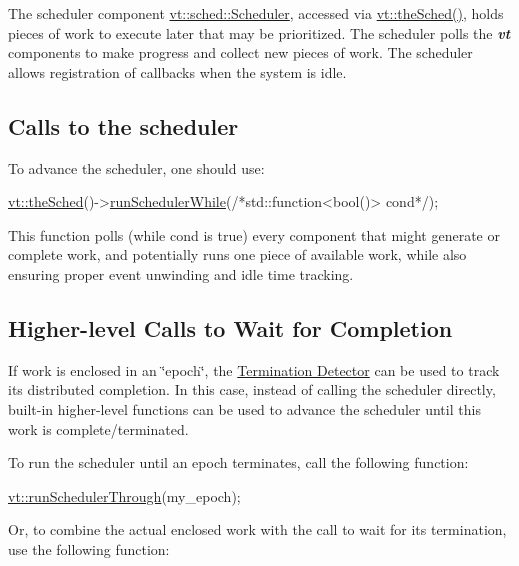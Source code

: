 The scheduler component {\ttfamily \hyperlink{structvt_1_1sched_1_1_scheduler}{vt\+::sched\+::\+Scheduler}}, accessed via {\ttfamily \hyperlink{namespacevt_a4508b38e6ab664b64f1415aecbb83571}{vt\+::the\+Sched()}}, holds pieces of work to execute later that may be prioritized. The scheduler polls the {\bfseries {\itshape vt}} components to make progress and collect new pieces of work. The scheduler allows registration of callbacks when the system is idle.\hypertarget{scheduler_calls-to-the-scheduler}{}\subsection{Calls to the scheduler}\label{scheduler_calls-to-the-scheduler}
To advance the scheduler, one should use\+:


\begin{DoxyCode}
\hyperlink{namespacevt_a4508b38e6ab664b64f1415aecbb83571}{vt::theSched}()->\hyperlink{structvt_1_1sched_1_1_scheduler_a9c130fc0ccbf237633420a7aa35069a4}{runSchedulerWhile}(\textcolor{comment}{/*std::function<bool()> cond*/});
\end{DoxyCode}


This function polls (while {\ttfamily cond} is true) every component that might generate or complete work, and potentially runs one piece of available work, while also ensuring proper event unwinding and idle time tracking.\hypertarget{scheduler_higher-level-calls}{}\subsection{Higher-\/level Calls to Wait for Completion}\label{scheduler_higher-level-calls}
If work is enclosed in an \char`\"{}epoch\char`\"{}, the \hyperlink{term}{Termination Detector} can be used to track its distributed completion. In this case, instead of calling the scheduler directly, built-\/in higher-\/level functions can be used to advance the scheduler until this work is complete/terminated.

To run the scheduler until an epoch terminates, call the following function\+:


\begin{DoxyCode}
\hyperlink{namespacevt_aa550774c1c9c668176ce535fd7d58fb0}{vt::runSchedulerThrough}(my\_epoch);
\end{DoxyCode}


Or, to combine the actual enclosed work with the call to wait for its termination, use the following function\+:


